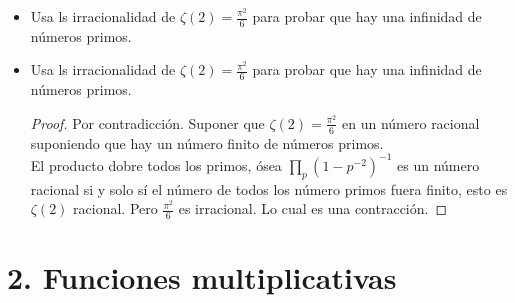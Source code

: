 \documentclass[12pt]{article}
\begin{document}
\begin{itemize}
    \item Usa ls irracionalidad de $\zeta(2) = \frac{\pi^2}{6}$ para probar que hay una infinidad de números primos.
    \item Usa ls irracionalidad de $\zeta(2) = \frac{\pi^2}{6}$ para probar que hay una infinidad de números primos.
    \begin{proof}
    Por contradicción. Suponer que $\zeta(2) = \frac{\pi^2}{6}$ en un número racional suponiendo
    que hay un número finito de números primos.\\
    El producto dobre todos los primos, ósea $\prod_{p} (1-p^{-2})^{-1}$ es un número racional si
    y solo sí el número de todos los número primos fuera finito, esto es $\zeta(2)$ racional.
    Pero $\frac{\pi^2}{6}$ es irracional. Lo cual es una contracción.
    \end{proof}
    
\end{itemize}



\section*{2. Funciones multiplicativas}
\end{document}
